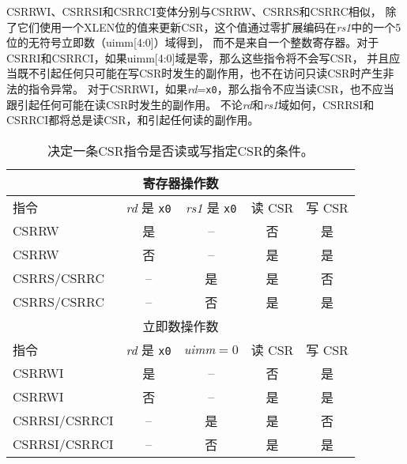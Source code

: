 CSRRWI、CSRRSI和CSRRCI变体分别与CSRRW、CSRRS和CSRRC相似，
除了它们使用一个XLEN位的值来更新CSR，这个值通过零扩展编码在{\em rs1}中的一个5位的无符号立即数（uimm[4:0]）域得到，
而不是来自一个整数寄存器。对于CSRRI和CSRRCI，如果uimm[4:0]域是零，那么这些指令将不会写CSR，
并且应当既不引起任何只可能在写CSR时发生的副作用，也不在访问只读CSR时产生非法的指令异常。
对于CSRRWI，如果{\em rd}={\tt x0}，那么指令不应当读CSR，也不应当跟引起任何可能在读CSR时发生的副作用。
不论{\em rd}和{\em rs1}域如何，CSRRSI和CSRRCI都将总是读CSR，和引起任何读的副作用。

\begin{table}
  \centering
  \begin{tabular}{|l|c|c|c|c|}
    \hline
    \multicolumn{5}{|c|}{寄存器操作数} \\
    \hline
    指令 & \textit{rd} 是 \texttt{x0}
                      & \textit{rs1} 是 \texttt{x0}
                            & 读 CSR & 写 CSR \\
    \hline
    CSRRW       & 是 & --  & 否  & 是 \\
    CSRRW       & 否  & --  & 是 & 是 \\
    CSRRS/CSRRC & --  & 是 & 是 & 否 \\
    CSRRS/CSRRC & --  & 否  & 是 & 是 \\
    \hline
    \multicolumn{5}{|c|}{立即数操作数} \\
    \hline
    指令 & \textit{rd} 是 \texttt{x0}
                        & \textit{uimm}$=$0
                              & 读 CSR & 写 CSR \\
    \hline
    CSRRWI        & 是 & --  & 否  & 是 \\
    CSRRWI        & 否  & --  & 是 & 是 \\
    CSRRSI/CSRRCI & --  & 是 & 是 & 否 \\
    CSRRSI/CSRRCI & --  & 否  & 是 & 是 \\
    \hline
  \end{tabular}
  \caption{决定一条CSR指令是否读或写指定CSR的条件。  
    }
  \label{tab:csrsideeffects}
\end{table}

